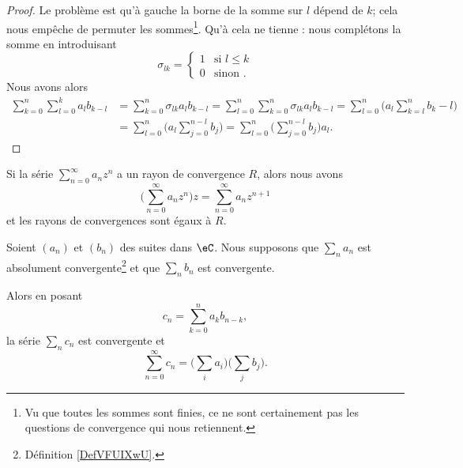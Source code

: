 \begin{proof}
	Le problème est qu'à gauche la borne de la somme sur \( l\) dépend de \( k\); cela nous empêche de permuter les sommes\footnote{Vu que toutes les sommes sont finies, ce ne sont certainement pas les questions de convergence qui nous retiennent.}. Qu'à cela ne tienne : nous complétons la somme en introduisant
	\begin{equation}
		\sigma_{lk}=\begin{cases}
			1 & \text{si } l\leq k \\
			0 & \text{sinon }.
		\end{cases}
	\end{equation}
	Nous avons alors
	\begin{subequations}
		\begin{align}
			\sum_{k=0}^n\sum_{l=0}^ka_lb_{k-l} & =\sum_{k=0}^n\sigma_{lk}a_lb_{k-l}=\sum_{l=0}^n\sum_{k=0}^n\sigma_{lk}a_lb_{k-l} =\sum_{l=0}^n\big( a_l\sum_{k=l}^nb_k-l \big) \\
			                                   & =\sum_{l=0}^n\big( a_l\sum_{j=0}^{n-l}b_j \big)=\sum_{l=0}^n\big( \sum_{j=0}^{n-l}b_j \big)a_l.
		\end{align}
	\end{subequations}
\end{proof}

\begin{lemma}        \label{LEMooLPBCooRWuvJB}
	Si la série \( \sum_{n=0}^{\infty}a_nz^n\) a un rayon de convergence \( R\), alors nous avons
	\begin{equation}
		\big( \sum_{n=0}^{\infty}a_nz^n \big)z=\sum_{n=0}^{\infty}a_nz^{n+1}
	\end{equation}
	et les rayons de convergences sont égaux à \( R\).
\end{lemma}

\begin{proposition}       \label{PROPooPKGEooZKyxwo}
	Soient \( (a_n)\) et \( (b_n)\) des suites dans \( \eC\). Nous supposons que \( \sum_na_n\) est absolument convergente\footnote{Définition \ref{DefVFUIXwU}.} et que \( \sum_nb_n\) est convergente.

	Alors en posant
	\begin{equation}
		c_n=\sum_{k=0}^na_kb_{n-k},
	\end{equation}
	la série \( \sum_nc_n\) est convergente et
	\begin{equation}
		\sum_{n=0}^{\infty}c_n=\big( \sum_ia_i \big)\big( \sum_j b_j \big).
	\end{equation}
\end{proposition}

